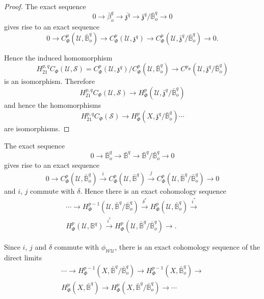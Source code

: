 \begin{proof} 
The exact sequence 
$$
0 \to \bar{\beta}^q_o \to \bar{\mathfrak{z}^q} \to 
\bar{\mathfrak{z}}^q/ \bar{\mathbb{B}}^q_o \to 0 
$$
gives rise to an exact sequence  
$$
0 \to C^p_{\Phi}(\mathscr{U} , \bar{\mathbb{B}}^q_o) \to 
C^p_{\Phi}(\mathscr{U}, \mathfrak{z}^q) \to
C^p_{\Phi}(\mathscr{U} , \bar{\mathfrak{z}}^q/ \bar{\mathbb{B}}^q_o) \to
0. 
$$

Hence the induced homomorphism 
$$
H^{p,q}_{21} C_{\Phi}(\mathscr{U},\mathscr{S})=
C^p_{\Phi}(\mathscr{U},\mathfrak{z}^q)/
C^p_{\Phi}(\mathscr{U},\bar{\mathbb{B}}^q_o) \to
C^{p_{\Phi}}(\mathscr{U},\bar{\mathfrak{z}}^q / \bar{\mathbb{B}}^q_o) 
$$
is an isomorphism. Therefore 
$$
H^{p,q}_{21} C_{\Phi}(\mathscr{U},\mathscr{S}) \to
H^p_{\Phi}(\mathscr{U},\bar{\mathfrak{z}}^q / \bar{\mathbb{B}}^q_o) 
$$ 
and hence the homomorphisms 
\begin{equation*}
H^{p,q}_{21} C_{\Phi}(\mathscr{S}) \to
H^p_{\Phi}(X,\bar{\mathfrak{z}}^q / \bar{\mathbb{B}}^q_o) \cdots
\tag{1}\label{chap22:eq1}  
\end{equation*}
are isomorphisms.
\end{proof}

The exact sequence 
$$
0 \to \bar{\mathbb{B}}^q_o \to \bar{\mathbb{B}}^q \to
\bar{\mathbb{B}}^q/ \bar{\mathbb{B}}^q_o \to 0 
$$
gives rise to an exact sequence 
$$
0 \to C^p_{\Phi}(\mathscr{U},\bar{\mathbb{B}}^q_o) \overset{i}{\to}
C^p_{\Phi}(\mathscr{U},\bar{\mathbb{B}}^q) \overset{j}{\to}
C^p_{\Phi}(\mathscr{U},\bar{\mathbb{B}}^q / \bar{\mathbb{B}}^q_o) \to
0 
$$
and $i$, $j$ commute with $\delta$. Hence there is an exact cohomology 
sequence\pageoriginale 
\begin{multline*}
\cdots \to H^{p-1}_{\Phi}(\mathscr{U},\bar{\mathbb{B}}^q /
\bar{\mathbb{B}}^q_o) \xrightarrow{\delta^*}
H^{p}_{\Phi}(\mathscr{U},\bar{\mathbb{B}}^q_o)\xrightarrow{i^*}\\
H^{p}_{\Phi}(\mathscr{U}, \mathbb{B}^q) \xrightarrow{i^*}
H^{p}_{\Phi}(\mathscr{U},\bar{\mathbb{B}}^q / \bar{\mathbb{B}}^q_o)
\to. 
\end{multline*}

Since $i$, $j$ and $\delta$ commute with $\phi_{\mathscr{W}
  \mathscr{U}}$, there is an exact cohomology sequence of the direct
limits 
\begin{multline*}
\cdots \to H^{p-1}_{\Phi}(X,\bar{\mathbb{B}}^q / \bar{\mathbb{B}}^q_o)
\to H^{p-1}_{\Phi}(X,\bar{\mathbb{B}}^q_o) \to\\
H^{p}_{\Phi}(X,\bar{\mathbb{B}}^q) \to
H^{p}_{\Phi}(X,\bar{\mathbb{B}}^q / \bar{\mathbb{B}}^q_o) \to \cdots 
\end{multline*}

